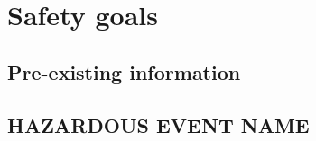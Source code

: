 \section{Safety goals}
%
%
% 

\subsection{Pre-existing information}
%

\subsection{HAZARDOUS EVENT NAME}
%
%
%
%
%
%


